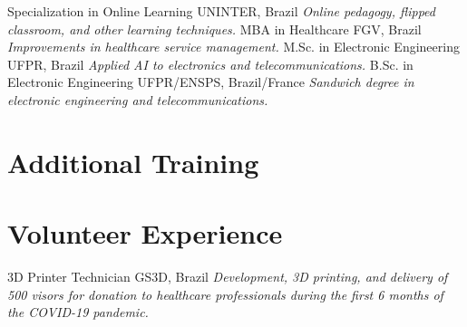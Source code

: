 \documentclass[letterpaper]{twentysecondcv_en} %
\begin{document}
\begin{twenty} %
						{Specialization in Online Learning}
						{UNINTER, Brazil}
						{\emph{Online pedagogy, flipped classroom, and other learning 
						techniques.}}
						{MBA in Healthcare}
						{FGV, Brazil}
						{\emph{Improvements in healthcare service management.}}
						{M.Sc. in Electronic Engineering}
						{UFPR, Brazil}
						{\emph{Applied AI to electronics and telecommunications.}}
						{B.Sc. in Electronic Engineering}
						{UFPR/ENSPS, Brazil/France}
						{\emph{Sandwich degree in electronic engineering and 
						telecommunications.}}
\end{twenty}


\section{Additional Training}

\begin{twenty} %
\end{twenty}


\section{Volunteer Experience}

\begin{twenty} %
						{3D Printer Technician}
						{GS3D, Brazil}
						{\emph{Development, 3D printing, and delivery of 500 visors for 
						donation to healthcare professionals during the first 6 months of 
						the COVID-19 pandemic.}}

\end{twenty}
\end{document}

